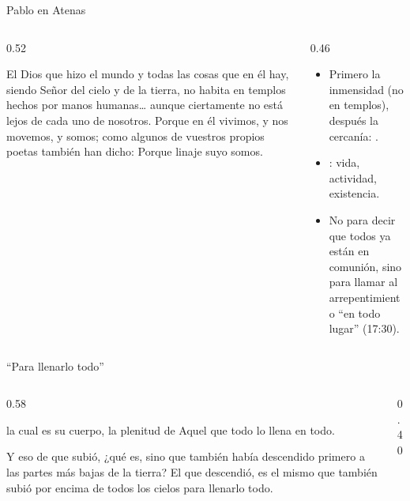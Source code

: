 \begin{frame}{Pablo en Atenas}
\begin{columns}[t,onlytextwidth]
\begin{column}{0.52\textwidth}
\begin{cita}[fontupper=\scriptsize\itshape]El Dios que hizo el mundo y todas las cosas que en él hay, siendo Señor del cielo y de la tierra, no habita en templos hechos por manos humanas\ldots{} aunque ciertamente no está lejos de cada uno de nosotros. Porque en él vivimos, y nos movemos, y somos; como algunos de vuestros propios poetas también han dicho: Porque linaje suyo somos.\end{cita}
\end{column}
\begin{column}{0.46\textwidth}\small
\begin{itemize}
\item Primero la inmensidad (no en templos), después la cercanía: .
\item {}: vida, actividad, existencia.
\item No para decir que todos ya están en comunión, sino para llamar al arrepentimiento ``en todo lugar'' (17:30).
\end{itemize}
\end{column}
\end{columns}\par\smallskip
{}
\end{frame}

\begin{frame}{``Para llenarlo todo''}
\begin{columns}[c,onlytextwidth]
\begin{column}{0.58\textwidth}
\begin{cita}[fontupper=\scriptsize\itshape]la cual es su cuerpo, la plenitud de Aquel que todo lo llena en todo.\end{cita}
\begin{cita}[fontupper=\scriptsize\itshape]Y eso de que subió, ¿qué es, sino que también había descendido primero a las partes más bajas de la tierra? El que descendió, es el mismo que también subió por encima de todos los cielos para llenarlo todo.\end{cita}
\end{column}
\begin{column}{0.40\textwidth}\end{column}
\end{columns}
\end{frame}

